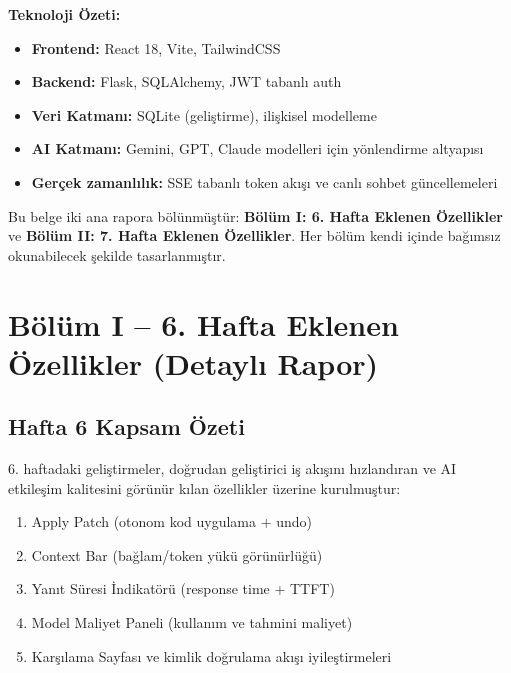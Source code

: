 \documentclass[12pt,a4paper]{article}
\begin{document}
\textbf{Teknoloji Özeti:}
\begin{itemize}[leftmargin=*]
  \item \textbf{Frontend:} React 18, Vite, TailwindCSS
  \item \textbf{Backend:} Flask, SQLAlchemy, JWT tabanlı auth
  \item \textbf{Veri Katmanı:} SQLite (geliştirme), ilişkisel modelleme
  \item \textbf{AI Katmanı:} Gemini, GPT, Claude modelleri için yönlendirme altyapısı
  \item \textbf{Gerçek zamanlılık:} SSE tabanlı token akışı ve canlı sohbet güncellemeleri
\end{itemize}

\begin{infobox}
Bu belge iki ana rapora bölünmüştür:
\textbf{Bölüm I: 6. Hafta Eklenen Özellikler} ve
\textbf{Bölüm II: 7. Hafta Eklenen Özellikler}.
Her bölüm kendi içinde bağımsız okunabilecek şekilde tasarlanmıştır.
\end{infobox}

\newpage
\section{Bölüm I -- 6. Hafta Eklenen Özellikler (Detaylı Rapor)}

\subsection{Hafta 6 Kapsam Özeti}

6. haftadaki geliştirmeler, doğrudan geliştirici iş akışını hızlandıran ve AI etkileşim kalitesini görünür kılan özellikler üzerine kurulmuştur:
\begin{enumerate}[leftmargin=*, label=\textbf{H6.\arabic*.}]
  \item Apply Patch (otonom kod uygulama + undo)
  \item Context Bar (bağlam/token yükü görünürlüğü)
  \item Yanıt Süresi İndikatörü (response time + TTFT)
  \item Model Maliyet Paneli (kullanım ve tahmini maliyet)
  \item Karşılama Sayfası ve kimlik doğrulama akışı iyileştirmeleri
\end{enumerate}
\end{document}
